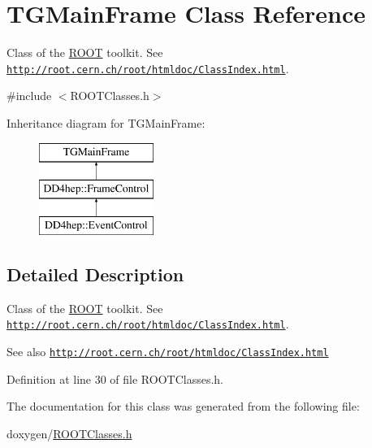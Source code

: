 \hypertarget{class_t_g_main_frame}{}\section{T\+G\+Main\+Frame Class Reference}
\label{class_t_g_main_frame}


Class of the \hyperlink{namespace_r_o_o_t}{R\+O\+OT} toolkit. See \href{http://root.cern.ch/root/htmldoc/ClassIndex.html}{\tt http\+://root.\+cern.\+ch/root/htmldoc/\+Class\+Index.\+html}.  




{\ttfamily \#include $<$R\+O\+O\+T\+Classes.\+h$>$}

Inheritance diagram for T\+G\+Main\+Frame\+:\begin{figure}[H]
\begin{center}
\leavevmode
\includegraphics[height=3.000000cm]{class_t_g_main_frame}
\end{center}
\end{figure}


\subsection{Detailed Description}
Class of the \hyperlink{namespace_r_o_o_t}{R\+O\+OT} toolkit. See \href{http://root.cern.ch/root/htmldoc/ClassIndex.html}{\tt http\+://root.\+cern.\+ch/root/htmldoc/\+Class\+Index.\+html}. 

\begin{DoxySeeAlso}{See also}
\href{http://root.cern.ch/root/htmldoc/ClassIndex.html}{\tt http\+://root.\+cern.\+ch/root/htmldoc/\+Class\+Index.\+html} 
\end{DoxySeeAlso}


Definition at line 30 of file R\+O\+O\+T\+Classes.\+h.



The documentation for this class was generated from the following file\+:\begin{DoxyCompactItemize}
\item 
doxygen/\hyperlink{_r_o_o_t_classes_8h}{R\+O\+O\+T\+Classes.\+h}\end{DoxyCompactItemize}
